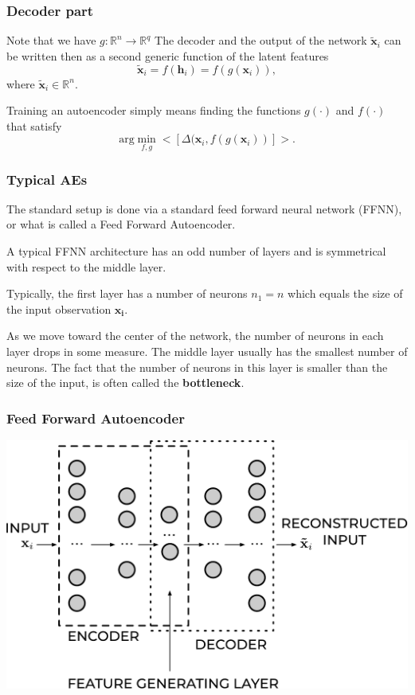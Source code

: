\documentclass{beamer}
\begin{document}
\begin{frame}
\frametitle{Decoder part}

Note that we have $g:\mathbb{R}^{n}\rightarrow\mathbb{R}^{q}$
The decoder and the output of the network $\tilde{\mathbf{x}}_{i}$ can be written then as a second generic function
of the latent features
\[
\tilde{\mathbf{x}}_{i} = f\left(\mathbf{h}_{i}\right) = f\left(g\left(\mathbf{x}_{i}\right)\right),
\]
where $\tilde{\mathbf{x}}_{i}\mathbf{\in }\mathbb{R}^{n}$.

Training an autoencoder simply means finding the functions $g(\cdot)$ and $f(\cdot)$
that satisfy
\[
\textrm{arg}\min_{f,g}<\left[\Delta (\mathbf{x}_{i}, f(g\left(\mathbf{x}_{i}\right))\right]>.
\]
\end{frame}

\begin{frame}
\frametitle{Typical AEs}

The standard setup is done via a standard feed forward neural network (FFNN), or what is called a Feed Forward Autoencoder.

A typical FFNN architecture has an odd number of layers and is symmetrical with respect to the middle layer.

Typically, the first layer has a number of neurons $n_{1} = n$ which equals the size of the input observation $\mathbf{x}_{\mathbf{i}}$.

As we move toward the center of the network, the number of neurons in each layer drops in some measure.
The middle layer usually has the smallest number of neurons.
The fact that the number of neurons in this layer is smaller than the size of the input, is often called the \textbf{bottleneck}.
\end{frame}

\begin{frame}
\frametitle{Feed Forward Autoencoder}

\vspace{6mm}

\centerline{\includegraphics[width=1.0\linewidth]{figures/ae2.pdf}}

\vspace{6mm}
\end{frame}
\end{document}
